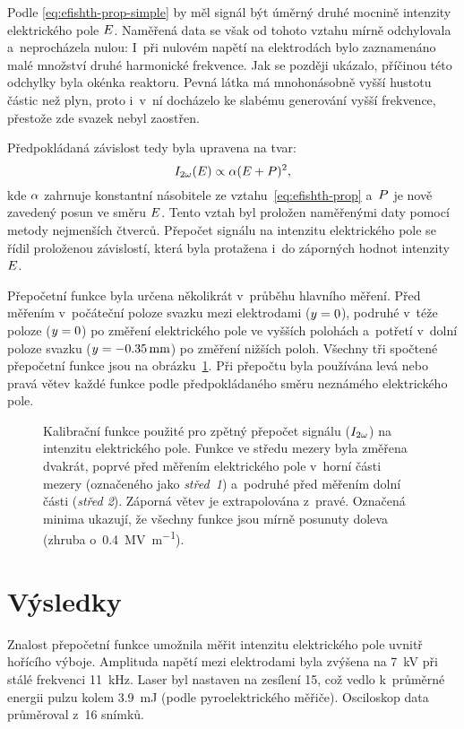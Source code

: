 Podle \eqref{eq:efishth-prop-simple} by měl signál \EFISH{} být úměrný
druhé mocnině intenzity elektrického pole $E$.
Naměřená data se však od tohoto vztahu mírně odchylovala a~neprocházela nulou:
I~při nulovém napětí na elektrodách bylo zaznamenáno malé množství
druhé harmonické frekvence.
Jak se později ukázalo, příčinou této odchylky byla okénka reaktoru.
Pevná látka má mnohonásobně vyšší hustotu částic než plyn,
proto i~v~ní docházelo ke slabému generování vyšší frekvence,
přestože zde svazek nebyl zaostřen.

Předpokládaná závislost tedy byla upravena na tvar:
\begin{equation}
	\label{eq:efish-prop}
	I_{2\omega}(E) \propto \alpha (E + P)^2,
\end{equation}
kde $\alpha$ zahrnuje konstantní násobitele
ze vztahu~\eqref{eq:efishth-prop}
a~$P$ je nově zavedený posun ve směru $E$.
Tento vztah byl proložen naměřenými daty pomocí metody nejmenších čtverců.
Přepočet signálu \EFISH{} na intenzitu elektrického pole se řídil
proloženou závislostí, která byla protažena i~do záporných hodnot
intenzity $E$.

Přepočetní funkce byla určena několikrát v~průběhu hlavního měření.
Před měřením v~počáteční poloze svazku mezi elektrodami ($y = 0$),
podruhé v~téže poloze ($y = 0$)
po změření elektrického pole ve vyšších polohách
a~potřetí v~dolní poloze svazku ($y = \SI{-0.35}{\milli\metre}$)
po změření nižších poloh.
Všechny tři spočtené přepočetní funkce jsou
na obrázku~\ref{fig:efish-period-calib}.
Při přepočtu byla používána levá nebo pravá větev každé funkce
podle předpokládaného směru neznámého elektrického pole.

\begin{figure}[hbp]
	\centering
	
	\caption{Kalibrační funkce použité pro zpětný přepočet signálu \EFISH{}
		($I_{2\omega}$) na intenzitu elektrického pole.
		Funkce ve středu mezery byla změřena dvakrát, poprvé před měřením
		elektrického pole v~horní části mezery
		(označeného jako \emph{střed~1})
		a~podruhé před měřením dolní části (\emph{střed 2}).
		Záporná větev je extrapolována z~pravé.
		Označená minima ukazují, že všechny funkce jsou mírně posunuty
		doleva (zhruba o~\SI{0.4}{\mega\volt\per\metre}).}
	\label{fig:efish-period-calib}
\end{figure}

\section{Výsledky}
\label{sec:efish-results}
Znalost přepočetní funkce umožnila měřit intenzitu elektrického pole
uvnitř hořícího výboje.
Amplituda napětí mezi elektrodami byla zvýšena na \SI{7}{\kilo\volt}
při stálé frekvenci \SI{11}{\kilo\hertz}.
Laser byl nastaven na zesílení 15, což vedlo k~průměrné energii pulzu
kolem \SI{3.9}{\milli\joule} (podle pyroelektrického měřiče).
Osciloskop data průměroval z~16 snímků.

